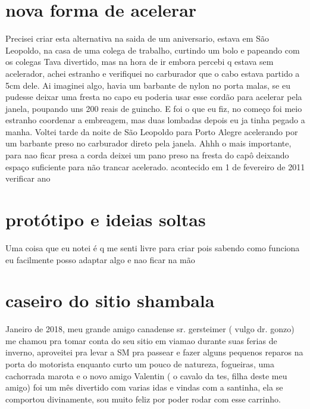 \documentclass[a4paper]{report}
\begin{document}
 

\section*{nova forma de acelerar}

Precisei criar esta alternativa na saida de um aniversario, estava em S\~ao Leopoldo, na casa de uma colega de trabalho, curtindo um bolo e papeando com os colegas
Tava divertido, mas na hora de ir embora percebi q estava sem acelerador, achei estranho e verifiquei no carburador que o cabo estava partido a 5cm dele.
Ai imaginei algo, havia um barbante de nylon no porta malas, se eu pudesse deixar uma fresta no capo eu poderia usar esse cord\~ao para acelerar pela janela, poupando uns 200 reais de guincho.
E foi o que eu fiz, no come\c{c}o foi meio estranho coordenar a embreagem, mas duas lombadas depois eu ja tinha pegado a manha.
Voltei tarde da noite de S\~ao Leopoldo para Porto Alegre acelerando por um barbante preso no carburador direto pela janela.
Ahhh o mais importante, para nao ficar presa a corda deixei um pano preso na fresta do cap\^o deixando espa\c{c}o suficiente para n\~ao trancar acelerado. 
acontecido em 1 de fevereiro de 2011 verificar ano


\section*{prot\'otipo e ideias soltas}
Uma coisa que eu notei \'e q me senti livre para criar pois sabendo como funciona eu facilmente posso adaptar algo e nao ficar na m\~ao


\section*{caseiro do sitio shambala}


Janeiro de 2018, meu grande amigo canadense sr. gersteimer ( vulgo dr. gonzo) me chamou pra tomar conta do seu sitio em viamao durante suas ferias de inverno, aproveitei pra levar a SM pra passear e fazer alguns pequenos reparos na porta do motorista enquanto curto um pouco de natureza, fogueiras, uma cachorrada marota e o novo amigo Valentin ( o cavalo da tes, filha deste meu amigo) foi um m\^es divertido com varias idas e vindas com a santinha, ela se comportou divinamente, sou muito feliz por poder rodar com esse carrinho. 
\end{document}
